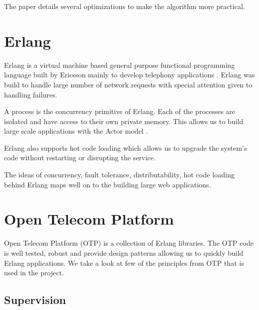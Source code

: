 The paper details several optimizations to make the algorithm more practical.

\section{Erlang}

Erlang \citep{erlang} is a virtual machine based general purpose functional
programming language built by Ericsson mainly to develop telephony applications
\citep{Armstrong07}. Erlang was build to handle large number of network
requests with special attention given to handling failures.

A process is the concurrency primitive of Erlang. Each of the processes are
isolated and have access to their own private memory. This allows us to build
large scale applications with the Actor model%
\citep{Clinger81}.

Erlang also supports hot code loading%
which allows us to upgrade the system's
code without restarting or disrupting the service.

The ideas of concurrency, fault tolerance, distributability, hot code loading
behind Erlang maps well on to the building large web applications.




\section{Open Telecom Platform}
\label{section:concepts.otp}

Open Telecom Platform (OTP) is a collection of Erlang libraries. The OTP code is
well tested, robust and provide design patterns allowing us to quickly build
Erlang applications. We take a look at few of the principles from OTP that is
used in the project.

\subsection{Supervision}
\label{section:concepts.supervision}

